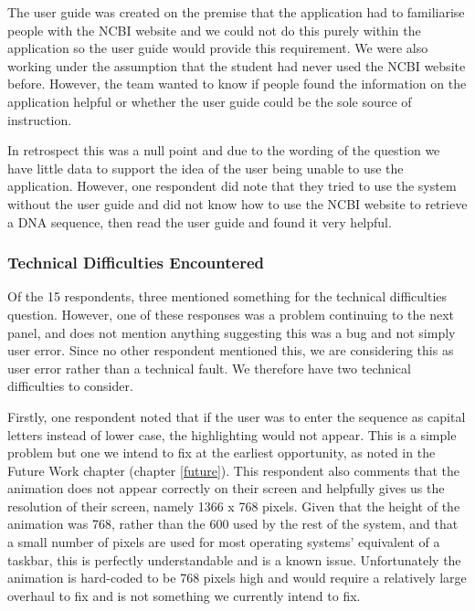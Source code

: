 The user guide was created on the premise that the application had to
familiarise people with the NCBI website \cite{ncbi} and we could not
do this purely within the application so the user guide would provide
this requirement.
We were also working under the assumption that the student had never
used the NCBI website \cite{ncbi} before.
However, the team wanted to know if people found the information on the
application helpful or whether the user guide could be the sole source
of instruction.

In retrospect this was a null point and due to the wording of the
question we have little data to support the idea of the user being
unable to use the application.
However, one respondent did note that they tried to use the system
without the user guide and did not know how to use the NCBI website
\cite{ncbi} to retrieve a DNA sequence, then read the user guide and
found it very helpful. 

\subsubsection{Technical Difficulties Encountered}

Of the 15 respondents, three mentioned something for the technical
difficulties question.
However, one of these responses was a problem continuing to the next
panel, and does not mention anything suggesting this was a bug and not
simply user error.
Since no other respondent mentioned this, we are considering this as
user error rather than a technical fault.
We therefore have two technical difficulties to consider.

Firstly, one respondent noted that if the user was to enter the
sequence as capital letters instead of lower case, the highlighting
would not appear.
This is a simple problem but one we intend to fix at the earliest
opportunity, as noted in the Future Work chapter (chapter
\ref{future}).
This respondent also comments that the animation does not appear
correctly on their screen and helpfully gives us the resolution of
their screen, namely 1366 x 768 pixels.
Given that the height of the animation was 768, rather than the 600
used by the rest of the system, and that a small number of pixels are
used for most operating systems' equivalent of a taskbar, this is
perfectly understandable and is a known issue.
Unfortunately the animation is hard-coded to be 768 pixels high and
would require a relatively large overhaul to fix and is not something we
currently intend to fix.

